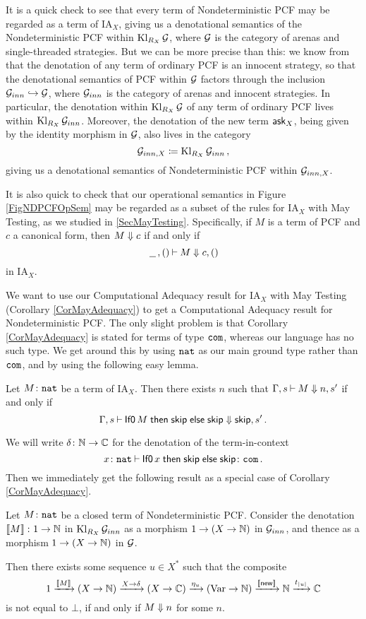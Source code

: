 It is a quick check to see that every term of Nondeterministic PCF may be regarded as a term of IA${}_X$, giving us a denotational semantics of the Nondeterministic PCF within $\operatorname{Kl}_{R_X}\mathcal G$, where $\mathcal G$ is the category of arenas and single-threaded strategies.
But we can be more precise than this: we know from \cite{hoPcf} that the denotation of any term of ordinary PCF is an innocent strategy, so that the denotational semantics of PCF within $\mathcal G$ factors through the inclusion $\mathcal G_{inn}\hookrightarrow\mathcal G$, where $\mathcal G_{inn}$ is the category of arenas and innocent strategies.
In particular, the denotation within $\operatorname{Kl}_{R_X}\mathcal G$ of any term of ordinary PCF lives within $\operatorname{Kl}_{R_X}\mathcal G_{inn}$.
Moreover, the denotation of the new term $\operatorname{{\mathsf{ask}}}_X$, being given by the identity morphism in $\mathcal G$, also lives in the category
\[
  \mathcal G_{inn,X} \coloneqq \operatorname{Kl}_{R_X}\mathcal G_{inn}\,,
  \]
giving us a denotational semantics of Nondeterministic PCF within $\mathcal G_{inn,X}$.

It is also quick to check that our operational semantics in Figure \ref{FigNDPCFOpSem} may be regarded as a subset of the rules for IA${}_X$ with May Testing, as we studied in \sec \ref{SecMayTesting}.
Specifically, if $M$ is a term of PCF and $c$ a canonical form, then $M\Downarrow c$ if and only if
\[
  \,\underline{\hspace{1.5ex}}\,,()\mathbin{\vdash} M\Downarrow c,()
  \]
in IA${}_X$.

We want to use our Computational Adequacy result for IA${}_X$ with May Testing (Corollary \ref{CorMayAdequacy}) to get a Computational Adequacy result for Nondeterministic PCF.
The only slight problem is that Corollary \ref{CorMayAdequacy} is stated for terms of type ${\mathtt{com}}$, whereas our language has no such type.  
We get around this by using ${\mathtt{nat}}$ as our main ground type rather than ${\mathtt{com}}$, and by using the following easy lemma.

\begin{lemma}
  Let $M\colon{\mathtt{nat}}$ be a term of IA${}_X$.  
  Then there exists $n$ such that $\Gamma,s\mathbin{\vdash} M\Downarrow n,s'$ if and only if
  \[
    \Gamma,s\mathbin{\vdash} \operatorname{{\mathsf{If0}}} M \mathrel{\mathsf{then}} {\mathsf{skip}} \mathrel{\mathsf{else}} {\mathsf{skip}} \Downarrow {\mathsf{skip}}, s'\,.
    \]
\end{lemma}

We will write $\delta\colon \mathbb{N} \to \mathbb{C}$ for the denotation of the term-in-context 
\[
  x\colon{\mathtt{nat}} \mathbin{\vdash} \operatorname{{\mathsf{If0}}} x \mathrel{\mathsf{then}} {\mathsf{skip}} \mathrel{\mathsf{else}} {\mathsf{skip}} \colon {\mathtt{com}}\,.
  \]
Then we immediately get the following result as a special case of Corollary \ref{CorMayAdequacy}.

\begin{corollary}
  Let $M\colon{\mathtt{nat}}$ be a closed term of Nondeterministic PCF.
  Consider the denotation $\left\llbracket M\right\rrbracket \colon 1 \to \mathbb{N}$ in $\operatorname{Kl}_{R_X}\mathcal G_{inn}$ as a morphism $1 \to (X \to \mathbb{N})$ in $\mathcal G_{inn}$, and thence as a morphism $1 \to (X \to \mathbb{N})$ in $\mathcal G$.

  Then there exists some sequence $u\in X^*$ such that the composite
  \[
    1 \xrightarrow{\left\llbracket M\right\rrbracket}
    (X \to \mathbb{N}) \xrightarrow{X \to \delta}
    (X \to \mathbb{C}) \xrightarrow{\eta_u}
    (\operatorname{Var} \to \mathbb{N}) \xrightarrow{\left\llbracket\operatorname{{\mathsf{new}}}\right\rrbracket}
    \mathbb{N} \xrightarrow{t_{|u|}}
    \mathbb{C}
    \]
  is not equal to $\bot$, if and only if $M\Downarrow n$ for some $n$.
  \label{CorMayAdequacyPCF}
\end{corollary}

